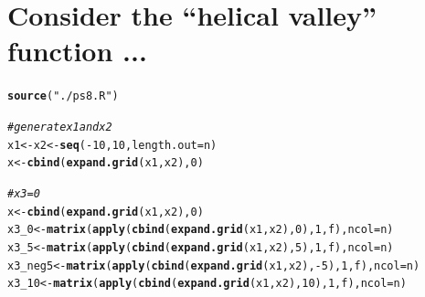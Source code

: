 \documentclass{article}\usepackage[]{graphicx}\usepackage[]{color}
\makeatletter
\newcommand{\hlnum}[1]{\textcolor[rgb]{0.686,0.059,0.569}{#1}}%
\newcommand{\hlstr}[1]{\textcolor[rgb]{0.192,0.494,0.8}{#1}}%
\newcommand{\hlcom}[1]{\textcolor[rgb]{0.678,0.584,0.686}{\textit{#1}}}%
\newcommand{\hlopt}[1]{\textcolor[rgb]{0,0,0}{#1}}%
\newcommand{\hlstd}[1]{\textcolor[rgb]{0.345,0.345,0.345}{#1}}%
\newcommand{\hlkwb}[1]{\textcolor[rgb]{0.69,0.353,0.396}{#1}}%
\newcommand{\hlkwc}[1]{\textcolor[rgb]{0.333,0.667,0.333}{#1}}%
\newcommand{\hlkwd}[1]{\textcolor[rgb]{0.737,0.353,0.396}{\textbf{#1}}}%
\newenvironment{kframe}{%
 \def\at@end@of@kframe{}%
 \ifinner\ifhmode%
  \def\at@end@of@kframe{\end{minipage}}%
  \begin{minipage}{\columnwidth}%
 \fi\fi%
 \def\FrameCommand##1{\hskip\@totalleftmargin \hskip-\fboxsep
 \colorbox{shadecolor}{##1}\hskip-\fboxsep
     \hskip-\linewidth \hskip-\@totalleftmargin \hskip\columnwidth}%
 \MakeFramed {\advance\hsize-\width
   \@totalleftmargin\z@ \linewidth\hsize
   \@setminipage}}%
 {\par\unskip\endMakeFramed%
 \at@end@of@kframe}
\newenvironment{knitrout}{}{} %
\makeatother
\begin{document}
\section{Consider the “helical valley” function ...}

\begin{knitrout}
\color{fgcolor}\begin{kframe}
\begin{alltt}
\hlkwd{source}\hlstd{(}\hlstr{"./ps8.R"}\hlstd{)}

\hlcom{#generate x1 and x2}
\hlstd{x1} \hlkwb{<-} \hlstd{x2} \hlkwb{<-} \hlkwd{seq}\hlstd{(}\hlopt{-}\hlnum{10}\hlstd{,} \hlnum{10}\hlstd{,} \hlkwc{length.out} \hlstd{= n)}
\hlstd{x} \hlkwb{<-} \hlkwd{cbind}\hlstd{(}\hlkwd{expand.grid}\hlstd{(x1, x2),} \hlnum{0}\hlstd{)}

\hlcom{#x3 = 0}
\hlstd{x} \hlkwb{<-} \hlkwd{cbind}\hlstd{(}\hlkwd{expand.grid}\hlstd{(x1, x2),} \hlnum{0}\hlstd{)}
\hlstd{x3_0}    \hlkwb{<-} \hlkwd{matrix}\hlstd{(}\hlkwd{apply}\hlstd{(}\hlkwd{cbind}\hlstd{(}\hlkwd{expand.grid}\hlstd{(x1, x2),} \hlnum{0}\hlstd{),} \hlnum{1}\hlstd{, f),} \hlkwc{ncol} \hlstd{= n)}
\hlstd{x3_5}    \hlkwb{<-} \hlkwd{matrix}\hlstd{(}\hlkwd{apply}\hlstd{(}\hlkwd{cbind}\hlstd{(}\hlkwd{expand.grid}\hlstd{(x1, x2),} \hlnum{5}\hlstd{),} \hlnum{1}\hlstd{, f),} \hlkwc{ncol} \hlstd{= n)}
\hlstd{x3_neg5} \hlkwb{<-} \hlkwd{matrix}\hlstd{(}\hlkwd{apply}\hlstd{(}\hlkwd{cbind}\hlstd{(}\hlkwd{expand.grid}\hlstd{(x1, x2),} \hlopt{-}\hlnum{5}\hlstd{),} \hlnum{1}\hlstd{, f),} \hlkwc{ncol} \hlstd{= n)}
\hlstd{x3_10}   \hlkwb{<-} \hlkwd{matrix}\hlstd{(}\hlkwd{apply}\hlstd{(}\hlkwd{cbind}\hlstd{(}\hlkwd{expand.grid}\hlstd{(x1, x2),} \hlnum{10}\hlstd{),} \hlnum{1}\hlstd{, f),} \hlkwc{ncol} \hlstd{= n)}


\end{alltt}
\end{kframe}
\end{knitrout}
\end{document}
